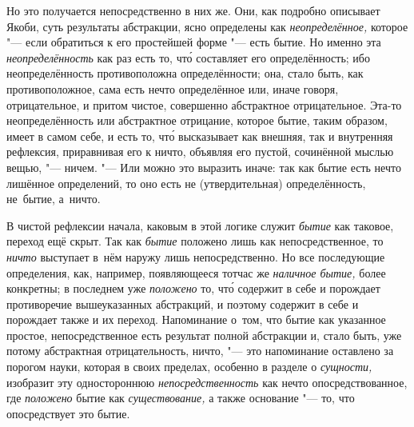 Но это получается непосредственно в них же. Они, как подробно описывает Якоби,
суть результаты абстракции, ясно определены как {\em неопределённое,} которое
"--- если обратиться к его простейшей форме "--- есть бытие. Но именно эта
{\em неопределённость} как раз есть то, чт\'{о} составляет его определённость;
ибо неопределённость противоположна определённости; она, стало быть, как
противоположное, сама есть нечто определённое или, иначе говоря, отрицательное,
и притом чистое, совершенно абстрактное отрицательное. Эта-то неопределённость
или абстрактное отрицание, которое бытие, таким образом, имеет в самом себе, и
есть то, чт\'{о} высказывает как внешняя, так и внутренняя рефлексия,
приравнивая его к ничто, объявляя его пустой, сочинённой мыслью вещью,
"--- ничем. "--- Или можно это выразить иначе: так как бытие есть нечто
лишённое определений, то оно есть не (утвердительная) определённость, не~бытие,
а~ничто.

В чистой рефлексии начала, каковым в этой логике служит {\em бытие} как
таковое, переход ещё скрыт. Так как {\em бытие} положено лишь как
непосредственное, то {\em ничто} выступает в~нём наружу лишь непосредственно.
Но все последующие определения, как, например, появляющееся тотчас же
{\em наличное бытие,} более конкретны; в последнем уже {\em положено} то,
чт\'{о} содержит в себе и порождает противоречие вышеуказанных абстракций, и
поэтому содержит в себе и порождает также и их переход. Напоминание
о~том, что бытие как указанное простое, непосредственное есть
результат полной абстракции и, стало быть, уже потому абстрактная
отрицательность, ничто, "--- это напоминание оставлено за порогом науки,
которая в своих пределах, особенно в разделе о {\em сущности,} изобразит
эту одностороннюю {\em непосредственность} как нечто опосредствованное,
где {\em положено} бытие как {\em существование,} а также основание "---
то, что опосредствует это бытие.

